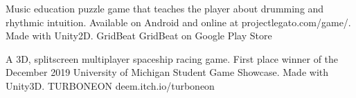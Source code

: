 \documentclass[]{awesome-cv}
\begin{document}


\vspace{-6mm}
\vspace{-2mm}

	\cventry
	{Music education puzzle game that teaches the player about drumming and rhythmic intuition. Available on Android and online at projectlegato.com/game/.
	 Made with Unity2D.}
	{GridBeat}
	{GridBeat on Google Play Store}
	{}
	{}

	\vspace{-6mm}
	\cventry
	{A 3D, splitscreen multiplayer spaceship racing game. First place winner of the December 2019 University of Michigan Student Game Showcase.
	 Made with Unity3D.}
	{TURBONEON}
	{deem.itch.io/turboneon}
	{}
	{}


	
\end{document}
